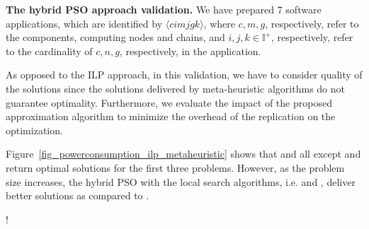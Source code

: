 \noindent\textbf{The hybrid PSO approach validation.} We have prepared 7 software applications, which are identified by $\langle cimjgk\rangle$, where $c,m,g$, respectively, refer to the components, computing nodes and chains, and $i,j,k\in\mathbb{I}^+$, respectively, refer to the cardinality of $c,n,g$, respectively, in the application.

As opposed to the ILP approach, in this validation, we have to consider quality of the solutions since the solutions delivered by meta-heuristic algorithms do not guarantee optimality. Furthermore, we evaluate the impact of the proposed approximation algorithm to minimize the overhead of the replication on the optimization. 

Figure~\ref{fig_powerconsumption_ilp_metaheuristic} shows that \ilp{} and all except \pso{} and \depso{} return optimal solutions for the first three problems. However, as the problem size increases, the hybrid PSO with the local search algorithms, i.e. \hcpso{} and \shpso{}, deliver better solutions as compared to \depso{}. 
\begin{center}
 {!} {
}
\end{center}

